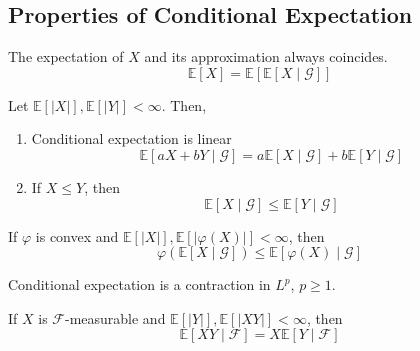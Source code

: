 \subsection{Properties of Conditional Expectation}

  \begin{theorem}
    The expectation of $X$ and its approximation always coincides. 
    \begin{equation}
      \mathbb{E}[X] = \mathbb{E}[\mathbb{E}[X \mid \mathcal{G}]]
    \end{equation}
  \end{theorem}

  \begin{lemma}
    Let $\mathbb{E}[|X|] , \mathbb{E}[|Y|] < \infty$. Then, 
    \begin{enumerate}
      \item Conditional expectation is linear
      \begin{equation}
        \mathbb{E}[a X + b Y \mid \mathcal{G}] = a \mathbb{E}[X \mid \mathcal{G}] + b \mathbb{E}[Y \mid \mathcal{G}]
      \end{equation}
      
      \item If $X \leq Y$, then 
      \begin{equation}
        \mathbb{E}[X \mid \mathcal{G}] \leq \mathbb{E}[Y \mid \mathcal{G}]
      \end{equation}
    \end{enumerate}
  \end{lemma}

  \begin{theorem}
    If $\varphi$ is convex and $\mathbb{E}[|X|], \mathbb{E}[|\varphi(X)|] < \infty$, then 
    \begin{equation}
      \varphi(\mathbb{E}[X \mid \mathcal{G}]) \leq \mathbb{E}[\varphi(X) \mid \mathcal{G}]
    \end{equation}
  \end{theorem}

  \begin{theorem}
    Conditional expectation is a contraction in $L^p$, $p \geq 1$. 
  \end{theorem}

  \begin{theorem}
    If $X$ is $\mathcal{F}$-measurable and $\mathbb{E}[|Y|], \mathbb{E}[|XY|] < \infty$, then 
    \begin{equation}
      \mathbb{E}[XY \mid \mathcal{F}] = X \mathbb{E}[Y \mid \mathcal{F}]
    \end{equation}
  \end{theorem}

